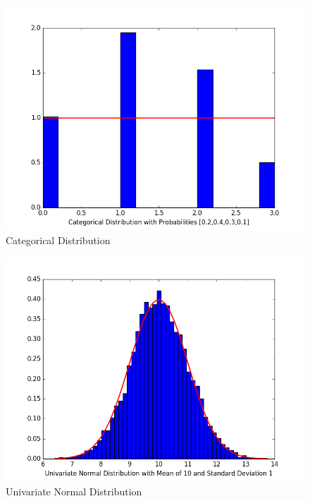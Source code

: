 \documentclass[paper=a4, fontsize=11pt]{scrartcl} %
\numberwithin{equation}{section} %
\numberwithin{figure}{section} %
\numberwithin{table}{section} %
\begin{document}
\begin{itemize}
	\begin{figure}
 		\centering
 		\includegraphics[scale=0.6]{Categorical.png}
 		\caption{Categorical Distribution}
 		\label{fig:categorical}
 	\end{figure}
 	\begin{figure}
 		\centering
 		\includegraphics[scale=0.6]{UnivariateNormal.png}
 		\caption{Univariate Normal Distribution}
 		\label{fig:univariate}
 	\end{figure}
 	\begin{figure}
 		\centering

\end{figure}
\end{itemize}
\end{document}
